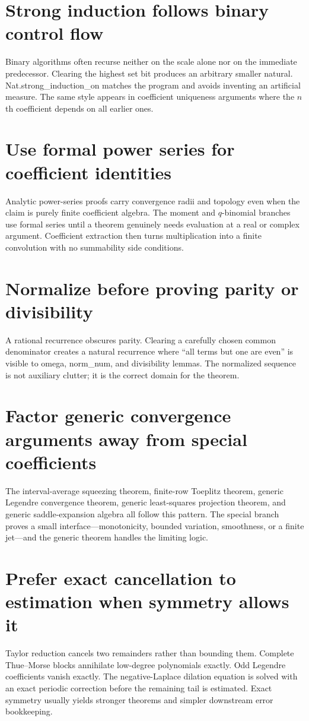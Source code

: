 \documentclass[11pt,a4paper,openany]{book}
\def\code#1{#1}
\newcommand{\code}[1]{\texttt{\detokenize{#1}}}
\begin{document}
\section{Strong induction follows binary control flow}
Binary algorithms often recurse neither on the scale alone nor on the immediate
predecessor.  Clearing the highest set bit produces an arbitrary smaller
natural.  \code{Nat.strong_induction_on} matches the program and avoids
inventing an artificial measure.  The same style appears in coefficient
uniqueness arguments where the $n$th coefficient depends on all earlier ones.

\section{Use formal power series for coefficient identities}
Analytic power-series proofs carry convergence radii and topology even when the
claim is purely finite coefficient algebra.  The moment and $q$-binomial
branches use formal series until a theorem genuinely needs evaluation at a real
or complex argument.  Coefficient extraction then turns multiplication into a
finite convolution with no summability side conditions.

\section{Normalize before proving parity or divisibility}
A rational recurrence obscures parity.  Clearing a carefully chosen common
denominator creates a natural recurrence where “all terms but one are even” is
visible to \code{omega}, \code{norm_num}, and divisibility lemmas.  The normalized
sequence is not auxiliary clutter; it is the correct domain for the theorem.

\section{Factor generic convergence arguments away from special coefficients}
The interval-average squeezing theorem, finite-row Toeplitz theorem, generic
Legendre convergence theorem, generic least-squares projection theorem, and
generic saddle-expansion algebra all follow this pattern.  The special branch
proves a small interface—monotonicity, bounded variation, smoothness, or a
finite jet—and the generic theorem handles the limiting logic.

\section{Prefer exact cancellation to estimation when symmetry allows it}
Taylor reduction cancels two remainders rather than bounding them.  Complete
Thue--Morse blocks annihilate low-degree polynomials exactly.  Odd Legendre
coefficients vanish exactly.  The negative-Laplace dilation equation is solved
with an exact periodic correction before the remaining tail is estimated.
Exact symmetry usually yields stronger theorems and simpler downstream error
bookkeeping.
\end{document}
